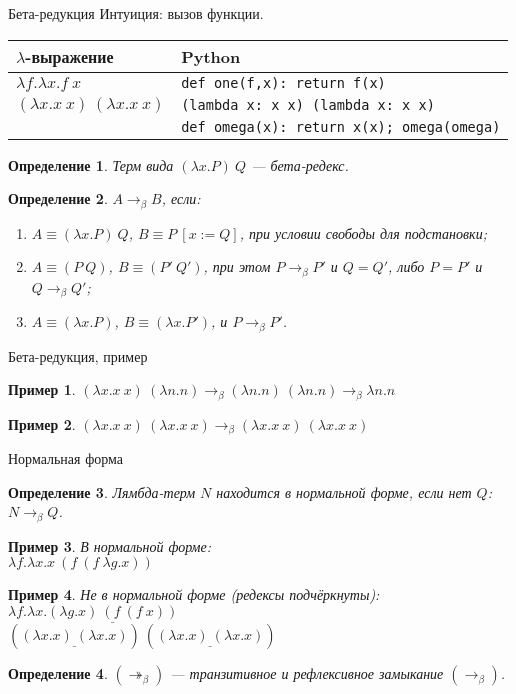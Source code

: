 \documentclass[aspectratio=169]{beamer}
\newtheorem{dfn}{Определение}[section]
\newtheorem{exm}{Пример}[section]
\begin{document}
\begin{frame}{Бета-редукция}
Интуиция: вызов функции.
\begin{center}\begin{tabular}{l|l}
$\lambda$-выражение & Python \\\hline
$\lambda f.\lambda x.f\ x$ & \texttt{def one(f,x): return f(x)}\\
$(\lambda x.x\ x)\ (\lambda x.x\ x)$ & \texttt{(lambda x: x x) (lambda x: x x)}\\
 &   \texttt{def omega(x): return x(x); omega(omega)}
\end{tabular}\end{center}

\pause
\begin{dfn} Терм вида $(\lambda x.P)\ Q$ --- бета-редекс.\end{dfn}
\begin{dfn} $A \rightarrow_\beta B$, если:
\begin{enumerate}
\item $A \equiv (\lambda x.P)\ Q$, $B \equiv P\ [x := Q]$, при условии свободы для подстановки;
\item $A \equiv (P\ Q)$, $B \equiv (P'\ Q')$, при этом $P \rightarrow_\beta P'$ и $Q = Q'$, либо $P = P'$ и $Q \rightarrow_\beta Q'$;
\item $A \equiv (\lambda x.P)$, $B \equiv (\lambda x.P')$, и $P \rightarrow_\beta P'$.
\end{enumerate}
\end{dfn}\end{frame}

\begin{frame}{Бета-редукция, пример}
\begin{exm}
$(\lambda x.x\ x)\ (\lambda n.n) \rightarrow_\beta (\lambda n.n)\ (\lambda n.n) \rightarrow_\beta \lambda n.n$
\end{exm}
\begin{exm}
$(\lambda x.x\ x)\ (\lambda x.x\ x) \rightarrow_\beta (\lambda x.x\ x)\ (\lambda x.x\ x)$
\end{exm}
\end{frame}

\begin{frame}{Нормальная форма}
\begin{dfn}Лямбда-терм $N$ находится в нормальной форме, если нет $Q$: $N \rightarrow_\beta Q$.\end{dfn}
\begin{exm}В нормальной форме:\\
$\lambda f.\lambda x.x\ (f\ (f\ \lambda g.x))$\end{exm}\pause
\begin{exm}Не в нормальной форме (редексы подчёркнуты):\\
$\lambda f.\lambda x.\underline{(\lambda g.x)\ (f\ (f\ x))}$\\
$(\underline{(\lambda x.x)\ (\lambda x.x)})\ (\underline{(\lambda x.x)\ (\lambda x.x)})$
\end{exm}
\begin{dfn}$(\twoheadrightarrow_\beta)$ --- транзитивное и рефлексивное замыкание $(\rightarrow_\beta)$.\end{dfn}
\end{frame}
\end{document}
